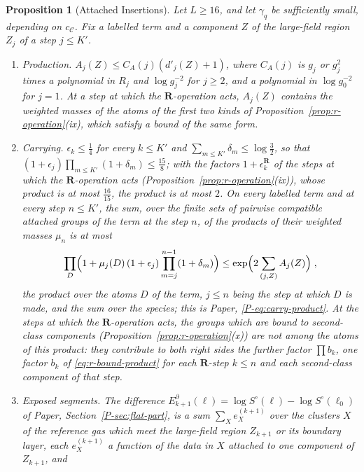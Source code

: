 \documentclass[11pt]{preprint}
\numberwithin{equation}{section}
\newtheorem{proposition}{Proposition}
\theoremstyle{definition}
\theoremstyle{remark}
\theoremstyle{plain}
\begin{document}
\begin{proposition}[Attached Insertions]\label{prop:attached}
Let $L \geq 16$, and let $\gamma_q$ be sufficiently small, depending on $c_{\mathcal C}$. Fix a labelled term and a component $Z$ of the large-field region $Z_j$ of a step $j \leq K'$.
\begin{enumerate}[label=(\roman*)]
\item \emph{Production.} $A_j(Z) \leq C_A(j)(d'_j(Z) + 1)$, where $C_A(j)$ is $g_j$ or $g_j^2$ times a polynomial in $R_j$ and $\log g_j^{-2}$ for $j \geq 2$, and a polynomial in $\log g_0^{-2}$ for $j = 1$. At a step at which the $\mathbf R$-operation acts, $A_j(Z)$ contains the weighted masses of the atoms of the first two kinds of Proposition~\ref{prop:r-operation}(ix), which satisfy a bound of the same form.
\item \emph{Carrying.} $\epsilon_k \leq \frac14$ for every $k \leq K'$ and $\sum_{m \leq K'}\delta_m \leq \log\frac32$, so that $(1 + \epsilon_j)\prod_{m \leq K'}(1 + \delta_m) \leq \frac{15}{8}$; with the factors $1 + \epsilon^{\mathbf R}_k$ of the steps at which the $\mathbf R$-operation acts (Proposition~\ref{prop:r-operation}(ix)), whose product is at most $\frac{16}{15}$, the product is at most $2$. On every labelled term and at every step $n \leq K'$, the sum, over the finite sets of pairwise compatible attached groups of the term at the step $n$, of the products of their weighted masses $\mu_n$ is at most
\begin{equation}\label{eq:carry-bound}
    \prod_{D}\Bigl(1 + \mu_j(D)\,(1 + \epsilon_j)\prod_{m=j}^{n-1}(1 + \delta_m)\Bigr) \leq \exp\Bigl(2\sum_{(j, Z)}A_j(Z)\Bigr)\;,
\end{equation}
the product over the atoms $D$ of the term, $j \leq n$ being the step at which $D$ is made, and the sum over the species; this is Paper, \eqref{P-eq:carry-product}. At the steps at which the $\mathbf R$-operation acts, the groups which are bound to second-class components (Proposition~\ref{prop:r-operation}(x)) are not among the atoms of this product: they contribute to both right sides the further factor $\prod b_k$, one factor $b_k$ of \eqref{eq:r-bound-product} for each $\mathbf R$-step $k \leq n$ and each second-class component of that step.
\item \emph{Exposed segments.} The difference $E^\partial_{k+1}(\ell) = \log S^\circ(\ell) - \log S^\circ(\ell_0)$ of Paper, Section~\ref{P-sec:flat-part}, is a sum $\sum_Xe^{(k+1)}_X$ over the clusters $X$ of the reference gas which meet the large-field region $Z_{k+1}$ or its boundary layer, each $e^{(k+1)}_X$ a function of the data in $X$ attached to one component of $Z_{k+1}$, and

\end{enumerate}
\end{proposition}
\end{document}
